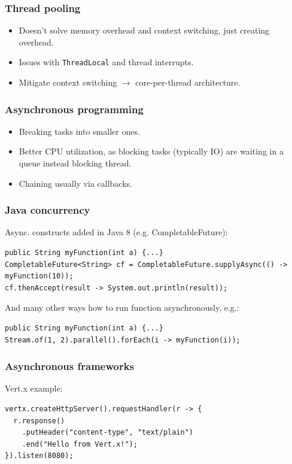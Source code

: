 \documentclass[10pt,utf8]{beamer}
\begin{document}
\begin{frame}
    \frametitle{Thread pooling}
    \begin{itemize}
        \item Doesn't solve memory overhead and context switching, just creating overhead.
        \item Issues with \texttt{ThreadLocal} and thread interrupts.
        \item Mitigate context switching $\rightarrow$ core-per-thread architecture.
    \end{itemize}
\end{frame}

\begin{frame}
    \frametitle{Asynchronous programming}
    \begin{itemize}
        \item Breaking tasks into smaller ones.
        \item Better CPU utilization, as blocking tasks (typically IO) are waiting in a queue instead blocking thread.
        \item Chaining usually via callbacks.
    \end{itemize}
\end{frame}

\begin{frame}[fragile]
    \frametitle{Java concurrency}
    Async. constructs added in Java 8 (e.g. CompletableFuture):
    \begin{lstlisting}[style=java]
public String myFunction(int a) {...}
CompletableFuture<String> cf = CompletableFuture.supplyAsync(() -> myFunction(10));
cf.thenAccept(result -> System.out.println(result));
    \end{lstlisting}
And many other ways how to run function asynchronously, e.g.:
    \begin{lstlisting}[style=java]
public String myFunction(int a) {...}
Stream.of(1, 2).parallel().forEach(i -> myFunction(i));
    \end{lstlisting}
\end{frame}

\begin{frame}[fragile]
    \frametitle{Asynchronous frameworks}

    \vspace{0.5cm}

Vert.x example:
    \begin{lstlisting}[style=java]
vertx.createHttpServer().requestHandler(r -> {
  r.response()
    .putHeader("content-type", "text/plain")
    .end("Hello from Vert.x!");
}).listen(8080);
    \end{lstlisting}
\end{frame}
\end{document}
